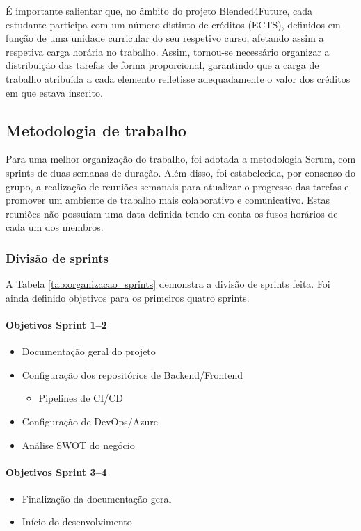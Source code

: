 É importante salientar que, no âmbito do projeto Blended4Future, cada estudante participa com um número distinto de créditos (ECTS), definidos em função de uma unidade curricular do seu respetivo curso, afetando assim a respetiva carga horária no trabalho. Assim, tornou-se necessário organizar a distribuição das tarefas de forma proporcional, garantindo que a carga de trabalho atribuída a cada elemento refletisse adequadamente o valor dos créditos em que estava inscrito.

\subsection{Metodologia de trabalho}

Para uma melhor organização do trabalho, foi adotada a metodologia Scrum, com sprints de duas semanas de duração. Além disso, foi estabelecida, por consenso do grupo, a realização de reuniões semanais para atualizar o progresso das tarefas e promover um ambiente de trabalho mais colaborativo e comunicativo. Estas reuniões não possuíam uma data definida tendo em conta os fusos horários de cada um dos membros.

\subsubsection{Divisão de sprints}

A Tabela \ref{tab:organizacao_sprints} demonstra a divisão de sprints feita. Foi ainda definido objetivos para os primeiros quatro sprints.

\paragraph*{Objetivos Sprint 1–2}
\begin{itemize}[nosep,leftmargin=*]
  \item Documentação geral do projeto
  \item Configuração dos repositórios de Backend/Frontend
    \begin{itemize}[nosep,leftmargin=*]
      \item Pipelines de CI/CD
    \end{itemize}
  \item Configuração de DevOps/Azure
  \item Análise SWOT do negócio
\end{itemize}

\paragraph*{Objetivos Sprint 3–4}
\begin{itemize}[nosep,leftmargin=*]
  \item Finalização da documentação geral
  \item Início do desenvolvimento
\end{itemize}



